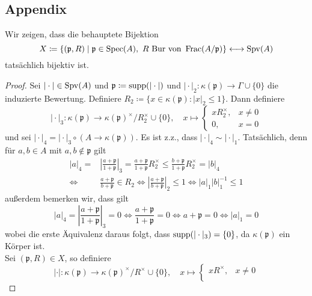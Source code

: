 \subsection*{Appendix}
Wir zeigen, dass die behauptete Bijektion  
\[
    X\coloneqq\{  (\mathfrak{p},R) \mid \mathfrak{p}\in \operatorname{Spec}(A), \ R \text{ Bur von } \operatorname{Frac}(A/\mathfrak{p}) \} \longleftrightarrow \operatorname{Spv}(A)    
\]
tatsächlich bijektiv ist. 
\begin{proof}
    Sei $\vert\cdot\vert \in \operatorname{Spv}(A)$ und $\mathfrak{p}\coloneqq \operatorname{supp}(\vert\cdot\vert)$ und $\vert \cdot \vert_2: \kappa(\mathfrak{p})\to \Gamma\cup \{0\}$ die induzierte Bewertung. Definiere $R_2\coloneqq \{ x\in \kappa(\mathfrak{p}) : \vert x\vert_2 \le 1\}$. Dann definiere 
    \[
    \vert\cdot\vert_3 : \kappa(\mathfrak{p}) \to \kappa(\mathfrak{p})^\times/R_2^\times \cup \{0\}, \quad x\mapsto \begin{cases}
        xR_2^\times, & x\neq 0\\
        0, & x=0
    \end{cases}    
    \] 
    und sei $\vert\cdot\vert_4 = \vert\cdot \vert_3 \circ (A\to \kappa(\mathfrak{p}))$. Es ist z.z., dass $\vert \cdot\vert_4 \sim \vert \cdot \vert_1$. Tatsächlich, denn für $a,b\in A$ mit $a,b\notin \mathfrak{p}$ gilt
    \begin{align*}
        \vert a\vert_4 = &\left\vert \frac{a+\mathfrak{p}}{1+\mathfrak{p}} \right\vert_3 = \frac{a+\mathfrak{p}}{1+\mathfrak{p}}R_2^\times \le \frac{b+\mathfrak{p}}{1+\mathfrak{p}}R_2^\times = \vert b\vert_4 \\
        \iff &\frac{a+\mathfrak{p}}{b+\mathfrak{p}}\in R_2 \iff \left\vert \frac{a+\mathfrak{p}}{b+\mathfrak{p}} \right\vert_2 \le 1 \iff \vert a\vert_1 \vert b\vert_1^{-1} \le 1
    \end{align*}
    außerdem bemerken wir, dass gilt
    \[
    \vert a\vert_4 = \left\vert \frac{a+\mathfrak{p}}{1+\mathfrak{p}} \right\vert_3 = 0 \Leftrightarrow \frac{a+\mathfrak{p}}{1+\mathfrak{p}} = 0 \Leftrightarrow a+\mathfrak{p} = 0 \Leftrightarrow \vert a\vert_1 = 0    
    \]
    wobei die erste Äquivalenz daraus folgt, dass $\operatorname{supp}(\vert\cdot\vert_3) = \{0\}$, da $\kappa(\mathfrak{p})$ ein Körper ist. \\
    Sei $(\mathfrak{p},R)\in X$, so definiere 
    \[
    \vert \cdot \vert : \kappa(\mathfrak{p}) \to \kappa(\mathfrak{p})^\times/R^\times \cup \{0\}, \quad x\mapsto \begin{cases}
        xR^\times, & x\neq 0 \\

\end{cases}\]
\end{proof}
